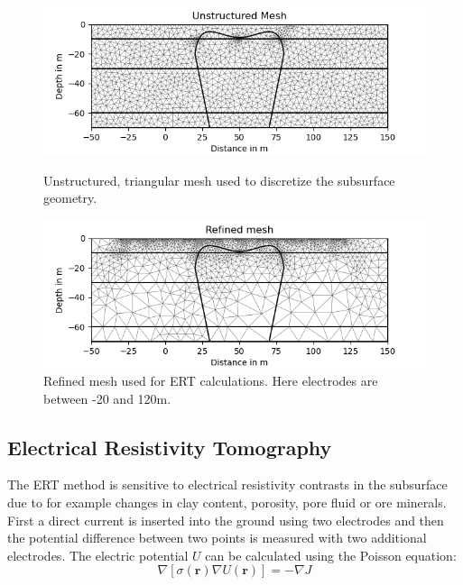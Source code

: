 \begin{figure}[]
  \centering
  \begin{minipage}[b]{0.49\textwidth}
    \includegraphics[width=\textwidth]{Figures/Mesh.png}
    \caption[Unstructured mesh]{Unstructured, triangular mesh used to discretize the subsurface geometry.}
    \label{figure:mesh}
  \end{minipage}
  \hfill
  \begin{minipage}[b]{0.49\textwidth}
    \includegraphics[width=\textwidth]{Figures/ERT_refined_mesh.png}
    \caption[Refined mesh used for ERT calculations]{Refined mesh used for ERT calculations. Here electrodes are between -20 and 120m.}
    \label{figure:refined_mesh}
  \end{minipage}
\end{figure}

\subsection{Electrical Resistivity Tomography}\label{section:ERT}
The ERT method is sensitive to electrical resistivity contrasts in the subsurface due to for example changes in clay content, porosity, pore fluid or ore minerals. First a direct current is inserted into the ground using two electrodes and then the potential difference between two points is measured with two additional electrodes. The electric potential $U$ can be calculated using the Poisson equation: 
\begin{equation}
    \nabla[\sigma (\textbf{r}) \nabla U(\textbf{r})] = -\nabla J
    \label{Eq:poisson}
\end{equation}

